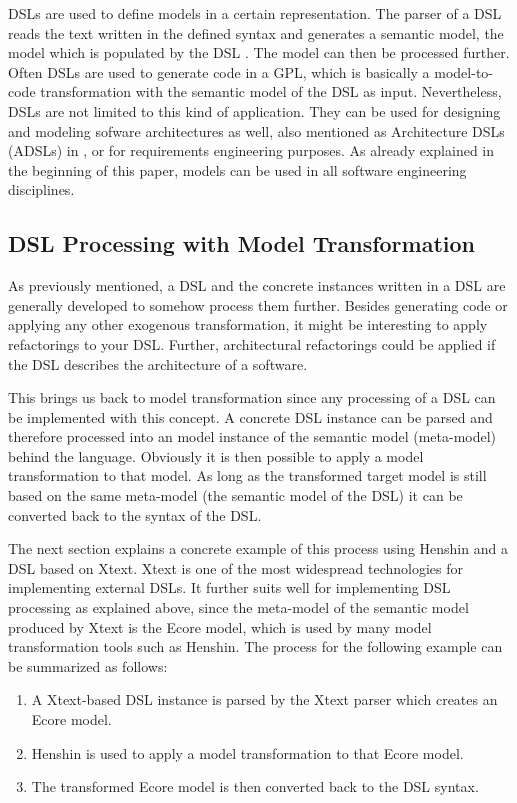 \documentclass[runningheads]{llncs}
\begin{document}
DSLs are used to define models in a certain representation. The parser of a DSL reads the text written in the defined syntax and generates a semantic model, the model which is populated by the DSL \cite{Fowler:2010:DSL:1809745}. The model can then be processed further. Often DSLs are used to generate code in a GPL, which is basically a model-to-code transformation with the semantic model of the DSL as input. Nevertheless, DSLs are not limited to this kind of application. They can be used for designing and modeling sofware architectures as well, also mentioned as Architecture DSLs (ADSLs) in \cite{Voelter}, or for requirements engineering purposes. As already explained in the beginning of this paper, models can be used in all software engineering disciplines.

\subsection{DSL Processing with Model Transformation}
As previously mentioned, a DSL and the concrete instances written in a DSL are generally developed to somehow process them further. Besides generating code or applying any other exogenous transformation, it might be interesting to apply refactorings to your DSL. Further, architectural refactorings \cite{ZimmermannArchitecturalRefactorings} could be applied if the DSL describes the architecture of a software.

This brings us back to model transformation since any processing of a DSL can be implemented with this concept. A concrete DSL instance can be parsed and therefore processed into an model instance of the semantic model (meta-model) behind the language. Obviously it is then possible to apply a model transformation to that model. As long as the transformed target model is still based on the same meta-model (the semantic model of the DSL) it can be converted back to the syntax of the DSL.

The next section explains a concrete example of this process using Henshin and a DSL based on Xtext. Xtext is one of the most widespread technologies for implementing external DSLs. It further suits well for implementing DSL processing as explained above, since the meta-model of the semantic model produced by Xtext is the Ecore model, which is used by many model transformation tools such as Henshin. The process for the following example can be summarized as follows:
\begin{enumerate}
	\item A Xtext-based DSL instance is parsed by the Xtext parser which creates an Ecore model.
	\item Henshin is used to apply a model transformation to that Ecore model.
	\item The transformed Ecore model is then converted back to the DSL syntax.
\end{enumerate}
\end{document}
